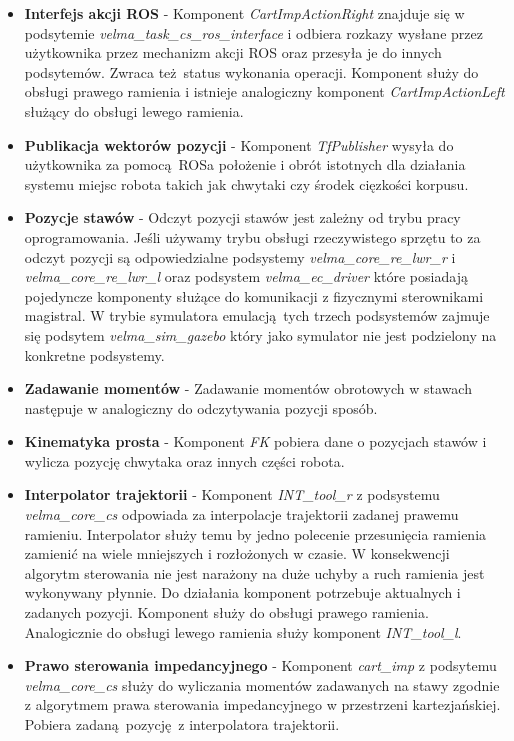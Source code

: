 	\begin{itemize}
	\item \textbf{Interfejs akcji ROS} - 
	Komponent \textit{CartImpActionRight} znajduje się w podsytemie \textit{velma\_task\_cs\_ros\_interface} i odbiera rozkazy wysłane przez użytkownika przez mechanizm akcji ROS oraz przesyła je do innych podsytemów. Zwraca też status wykonania operacji. Komponent służy do obsługi prawego ramienia i istnieje analogiczny komponent \textit{CartImpActionLeft} służący do obsługi lewego ramienia.
	\item \textbf{Publikacja wektorów pozycji} - 
	Komponent \textit{TfPublisher} wysyła do użytkownika za pomocą ROSa położenie i obrót istotnych dla działania systemu miejsc robota takich jak chwytaki czy środek cięzkości korpusu. 
	\item \textbf{Pozycje stawów} - 
	Odczyt pozycji stawów jest zależny od trybu pracy oprogramowania. Jeśli używamy trybu obsługi rzeczywistego sprzętu to za odczyt pozycji są odpowiedzialne podsystemy \textit{velma\_core\_re\_lwr\_r} i \textit{velma\_core\_re\_lwr\_l} oraz podsystem \textit{velma\_ec\_driver} które posiadają pojedyncze komponenty służące do komunikacji z fizycznymi sterownikami magistral. W trybie symulatora emulacją tych trzech podsystemów zajmuje się podsytem \textit{velma\_sim\_gazebo} który jako symulator nie jest podzielony na konkretne podsystemy.
	\item \textbf{Zadawanie momentów} - 
	Zadawanie momentów obrotowych w stawach następuje w analogiczny do odczytywania pozycji sposób.
	\item \textbf{Kinematyka prosta} - 
	Komponent \textit{FK} pobiera dane o pozycjach stawów i wylicza pozycję chwytaka oraz innych części robota.
	\item \textbf{Interpolator trajektorii} - 
	Komponent \textit{INT\_tool\_r} z podsystemu \textit{velma\_core\_cs} odpowiada za interpolacje trajektorii zadanej prawemu ramieniu. Interpolator służy temu by jedno polecenie przesunięcia ramienia zamienić na wiele mniejszych i rozłożonych w czasie. W konsekwencji algorytm sterowania nie jest narażony na duże uchyby a ruch ramienia jest wykonywany płynnie. Do działania komponent potrzebuje aktualnych i zadanych pozycji. Komponent służy do obsługi prawego ramienia. Analogicznie do obsługi lewego ramienia służy komponent \textit{INT\_tool\_l}.

	\item \textbf{Prawo sterowania impedancyjnego} - 
	Komponent \textit{cart\_imp} z podsytemu \textit{velma\_core\_cs} służy do wyliczania momentów zadawanych na stawy zgodnie z algorytmem prawa sterowania impedancyjnego w przestrzeni kartezjańskiej. Pobiera zadaną pozycję z interpolatora trajektorii.
	\end{itemize}